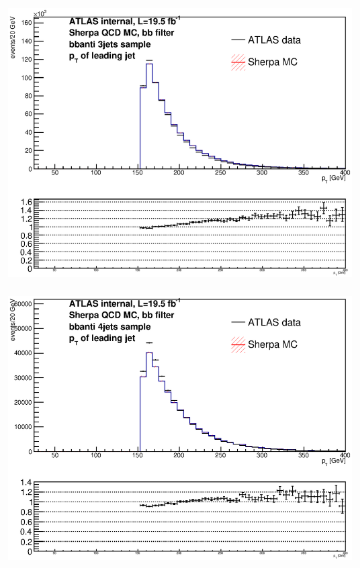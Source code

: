 \begin{figure}[phtb!]
\begin{center}
  \begin{subfigure}[$bbanti$ 3 jet category]{0.3\textwidth}\includegraphics[width=\textwidth]{MonteCarlo/figures/pt0_bbanti_3jets.eps}\end{subfigure}
  \begin{subfigure}[$bbanti$ 4 jet category]{0.3\textwidth}\includegraphics[width=\textwidth]{MonteCarlo/figures/pt0_bbanti_4jets.eps}\end{subfigure}

\end{center}
\end{figure}
